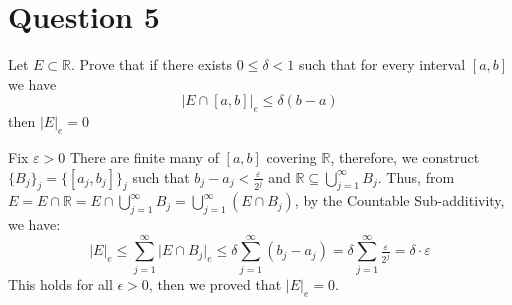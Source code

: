 \section{Question 5}

\begin{question}
    Let $E \subset \mathbb{R}$. Prove that if there exists $0 \leq \delta<1$ such that for every interval $[a, b]$ we have
    $$
    |E \cap[a, b]|_e \leq \delta(b-a)
    $$
    then $|E|_e=0$
\end{question}

\begin{answer}
    Fix $\varepsilon > 0$ There are finite many of $[a,b]$ covering $\mathbb{R}$, therefore, we construct $\{B_j\}_j = \{[a_j,b_j]\}_j$ such that $b_j - a_j < \tfrac{\varepsilon}{2^j}$ and $\mathbb{R} \subseteq \bigcup_{j = 1}^{\infty} B_j$. Thus, from $E = E \cap \mathbb{R} = E \cap \bigcup_{j=1}^{\infty}B_j = \bigcup_{j=1}^{\infty}(E \cap B_j)$, by the Countable Sub-additivity, we have:
    \begin{equation}
        \lvert E \rvert_e \leq \sum_{j = 1}^{\infty}\lvert E \cap B_j \rvert_e \leq \delta \sum_{j=1}^{\infty}(b_j-a_j) = \delta \sum_{j = 1}^{\infty}\tfrac{\varepsilon}{2^j} = \delta \cdot \varepsilon
    \end{equation}
    This holds for all $\epsilon > 0$, then we proved that $\lvert E \rvert_e = 0$.
\end{answer}

